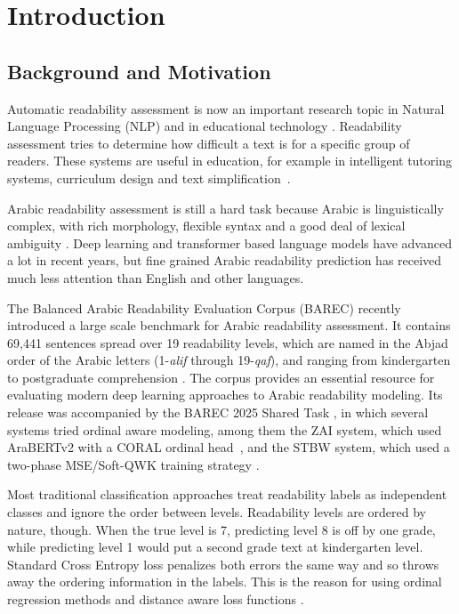 \chapter{Introduction}\label{chap:introduction}
\section{Background and Motivation}

Automatic readability assessment is now an important research topic in Natural Language Processing (NLP) and in educational technology \cite{dubay2004principles}. Readability assessment tries to determine how difficult a text is for a specific group of readers. These systems are useful in education, for example in intelligent tutoring systems, curriculum design and text simplification~\cite{vajjala2022trends}.

Arabic readability assessment is still a hard task because Arabic is linguistically complex, with rich morphology, flexible syntax and a good deal of lexical ambiguity \cite{nassiri2023approaches}. Deep learning and transformer based language models have advanced a lot in recent years, but fine grained Arabic readability prediction has received much less attention than English and other languages.

The Balanced Arabic Readability Evaluation Corpus (BAREC) recently introduced a large scale benchmark for Arabic readability assessment. It contains 69,441 sentences spread over 19 readability levels, which are named in the Abjad order of the Arabic letters (1-\textit{alif} through 19-\textit{qaf}), and ranging from kindergarten to postgraduate comprehension \cite{elmadani2025barec}. The corpus provides an essential resource for evaluating modern deep learning approaches to Arabic readability modeling. Its release was accompanied by the BAREC 2025 Shared Task \cite{elmadani2025sharedtask}, in which several systems tried ordinal aware modeling, among them the ZAI system, which used AraBERTv2 with a CORAL ordinal head~\cite{nazzal2025zai}, and the STBW system, which used a two-phase MSE/Soft-QWK training strategy \cite{trigui2025stbw}.

Most traditional classification approaches treat readability labels as independent classes and ignore the order between levels. Readability levels are ordered by nature, though. When the true level is 7, predicting level 8 is off by one grade, while predicting level 1 would put a second grade text at kindergarten level. Standard Cross Entropy loss penalizes both errors the same way and so throws away the ordering information in the labels. This is the reason for using ordinal regression methods and distance aware loss functions \cite{castagnos2022ordinal}.

